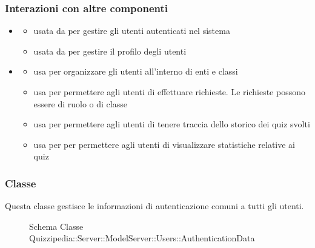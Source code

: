 \subsubsection{Interazioni con altre componenti}
\begin{itemize}
\item {}
\begin{itemize}
\item usata da  per gestire gli utenti autenticati nel sistema
\item usata da  per gestire il profilo degli utenti
\end{itemize}
\item {}
\begin{itemize}
\item usa  per organizzare gli utenti all'interno di enti e classi
\item usa  per permettere agli utenti di effettuare richieste. Le richieste possono essere di ruolo o di classe
\item usa  per permettere agli utenti di tenere traccia dello storico dei quiz svolti
\item usa  per per permettere agli utenti di visualizzare statistiche relative ai quiz
\end{itemize}
\end{itemize}
\subsubsection{Classe }
Questa classe gestisce le informazioni di autenticazione comuni a tutti gli utenti.
\begin{figure}[H]
\centering
\noindent{}
\caption[Schema Classe AuthenticationData]{Schema Classe Quizzipedia::Server::ModelServer::Users::AuthenticationData}
\end{figure}
